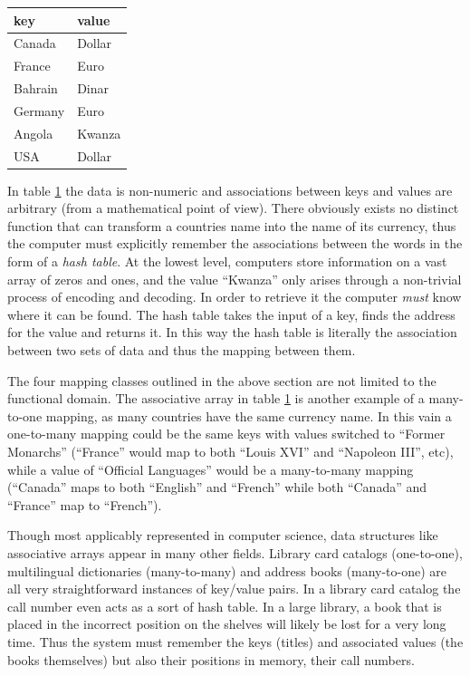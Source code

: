 \begin{table}
\centering
{}
\label{tab:key_value_pairs}
\begin{tabular}{l l}
\hline\hline
key&value\\
\hline
Canada&Dollar\\
France&Euro\\
Bahrain&Dinar\\
Germany&Euro\\
Angola&Kwanza\\
USA&Dollar\\
\hline
\end{tabular}
\end{table}

In table \ref{tab:key_value_pairs} the data is non-numeric and associations between keys and values are arbitrary (from a mathematical point of view). There obviously exists no distinct function that can transform a countries name into the name of its currency, thus the computer must explicitly remember the associations between the words in the form of a \emph{hash table}. At the lowest level, computers store information on a vast array of zeros and ones, and the value ``Kwanza'' only arises through a non-trivial process of encoding and decoding. In order to retrieve it the computer \emph{must} know where it can be found. The hash table takes the input of a key, finds the address for the value and returns it. In this way the hash table is literally the association between two sets of data and thus the mapping between them. 

The four mapping classes outlined in the above section are not limited to the functional domain. The associative array in table \ref{tab:key_value_pairs} is another example of a many-to-one mapping, as many countries have the same currency name. In this vain a one-to-many mapping could be the same keys with values switched to ``Former Monarchs'' (``France'' would map to both ``Louis XVI'' and ``Napoleon III'', etc), while a value of ``Official Languages'' would be a many-to-many mapping (``Canada'' maps to both ``English'' and ``French'' while both ``Canada'' and ``France'' map to ``French'').

Though most applicably represented in computer science, data structures like associative arrays appear in many other fields. Library card catalogs (one-to-one), multilingual dictionaries (many-to-many) and address books (many-to-one) are all very straightforward instances of key/value pairs. In a library card catalog the call number even acts as a sort of hash table. In a large library, a book that is placed in the incorrect position on the shelves will likely be lost for a very long time. Thus the system must remember the keys (titles) and associated values (the books themselves) but also their positions in memory, their call numbers.

